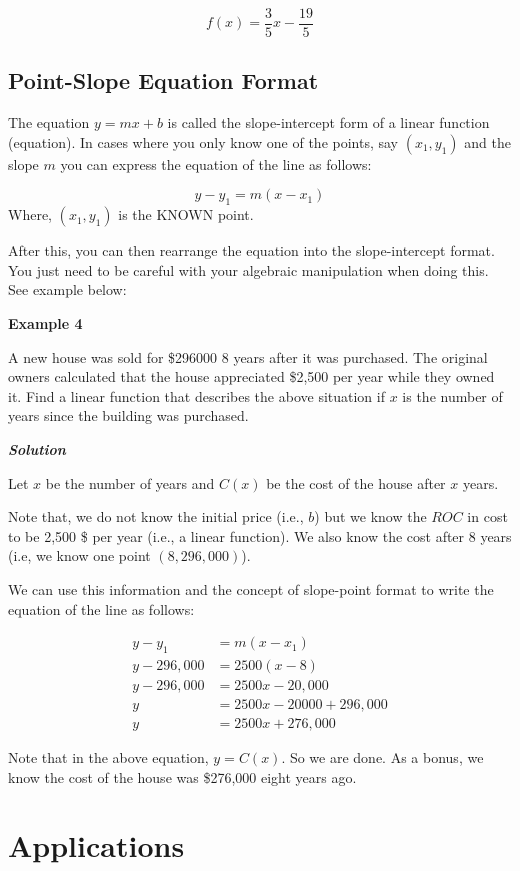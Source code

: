 \documentclass[
  letterpaper,
  DIV=11,
  numbers=noendperiod]{scrreprt}
\begin{document}
\[f(x)=\frac{3}{5}x-\frac{19}{5}\]

\hypertarget{point-slope-equation-format}{%
\section{Point-Slope Equation
Format}\label{point-slope-equation-format}}

The equation \(y=mx+b\) is called the slope-intercept form of a linear
function (equation). In cases where you only know one of the points, say
\((x_1,y_1)\) and the slope \(m\) you can express the equation of the
line as follows:

\[y-y_1=m(x-x_1)\] Where, \((x_1,y_1)\) is the KNOWN point.

After this, you can then rearrange the equation into the slope-intercept
format. You just need to be careful with your algebraic manipulation
when doing this. See example below:

\textbf{Example 4}

A new house was sold for \$296000 8 years after it was purchased. The
original owners calculated that the house appreciated \$2,500 per year
while they owned it. Find a linear function that describes the above
situation if \(x\) is the number of years since the building was
purchased.

\textbf{\emph{Solution}}

Let \(x\) be the number of years and \(C(x)\) be the cost of the house
after \(x\) years.

Note that, we do not know the initial price (i.e., \(b\)) but we know
the \(ROC\) in cost to be 2,500 \$ per year (i.e., a linear function).
We also know the cost after 8 years (i.e, we know one point
\((8, 296,000)\)).

We can use this information and the concept of slope-point format to
write the equation of the line as follows:

\begin{align}
y-y_1&=m(x-x_1)\\
y-296,000&=2500(x-8)\\
y-296,000&=2500x-20,000\\
y&=2500x-20000+296,000\\
y&=2500x+276,000
\end{align}

Note that in the above equation, \(y=C(x)\). So we are done. As a bonus,
we know the cost of the house was \$276,000 eight years ago.

\hypertarget{applications}{%
\chapter{Applications}\label{applications}}
\end{document}
